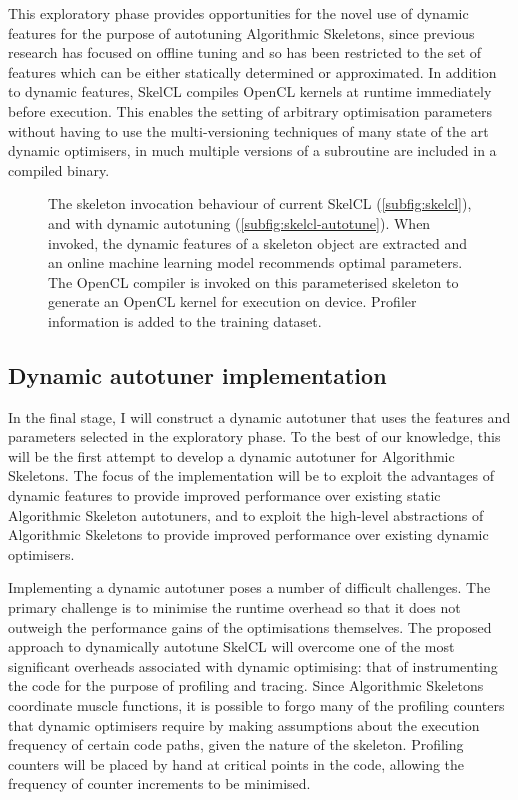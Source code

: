 This exploratory phase provides opportunities for the novel use of
dynamic features for the purpose of autotuning Algorithmic Skeletons,
since previous research has focused on offline tuning and so has been
restricted to the set of features which can be either statically
determined or approximated. In addition to dynamic features, SkelCL
compiles OpenCL kernels at runtime immediately before execution. This
enables the setting of arbitrary optimisation parameters without
having to use the multi-versioning techniques of many state of the art
dynamic optimisers, in much multiple versions of a subroutine are
included in a compiled binary.

\begin{figure}[t]
\centering

\caption{The skeleton invocation behaviour of current SkelCL
  (\ref{subfig:skelcl}), and with dynamic autotuning
  (\ref{subfig:skelcl-autotune}). When invoked, the dynamic features
  of a skeleton object are extracted and an online machine learning
  model recommends optimal parameters. The OpenCL compiler is invoked
  on this parameterised skeleton to generate an OpenCL kernel for
  execution on device. Profiler information is added to the training
  dataset.}
\label{fig:method}
\end{figure}

\subsection{Dynamic autotuner implementation}
In the final stage, I will construct a dynamic autotuner that uses the
features and parameters selected in the exploratory phase. To the best
of our knowledge, this will be the first attempt to develop a dynamic
autotuner for Algorithmic Skeletons. The focus of the implementation
will be to exploit the advantages of dynamic features to provide
improved performance over existing static Algorithmic Skeleton
autotuners, and to exploit the high-level abstractions of Algorithmic
Skeletons to provide improved performance over existing dynamic
optimisers.

Implementing a dynamic autotuner poses a number of difficult
challenges. The primary challenge is to minimise the runtime overhead
so that it does not outweigh the performance gains of the
optimisations themselves. The proposed approach to dynamically
autotune SkelCL will overcome one of the most significant overheads
associated with dynamic optimising: that of instrumenting the code for
the purpose of profiling and tracing. Since Algorithmic Skeletons
coordinate muscle functions, it is possible to forgo many of the
profiling counters that dynamic optimisers require by making
assumptions about the execution frequency of certain code paths, given
the nature of the skeleton. Profiling counters will be placed by hand
at critical points in the code, allowing the frequency of counter
increments to be minimised.

